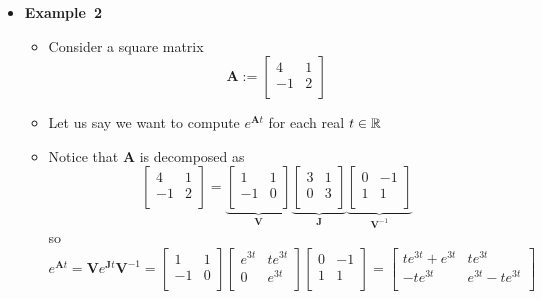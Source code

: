 \documentclass[12pt,a4paper]{article}
\begin{document}
\begin{itemize}
\item \textbf{Example~2}
  \begin{itemize}
  \item Consider a square matrix
    \begin{equation}\nonumber%
      \bm{A} :=
      \begin{bmatrix}
        4 & 1 \\
        -1 & 2 \\
      \end{bmatrix}
    \end{equation}
  \item Let us say we want to compute $e^{\bm{A}t}$ for each real $t\in \mathbb{R}$
  \item Notice that $\bm{A}$ is decomposed as
    \begin{equation}\nonumber%
      \begin{bmatrix}
        4 & 1 \\
        -1 & 2 \\
      \end{bmatrix}
      =
      \underbrace{
      \begin{bmatrix}
        1 & 1 \\
        -1 & 0 \\
      \end{bmatrix}}_{\bm{V}}
    \underbrace{
      \begin{bmatrix}
        3 & 1 \\
        0 & 3 \\
      \end{bmatrix}}_{\bm{J}}
    \underbrace{
      \begin{bmatrix}
        0 & -1 \\
        1 & 1 \\
      \end{bmatrix}}_{\bm{V}^{-1}}
    \end{equation}
    so
    \begin{equation}
      e^{\bm{A}t}
         = \bm{V}e^{\bm{J}t}\bm{V}^{-1}
         =
      \begin{bmatrix}
        1 & 1 \\
        -1 & 0 \\
      \end{bmatrix}
      \begin{bmatrix}
        e^{3t} & te^{3t} \\
        0 & e^{3t} \\
      \end{bmatrix}
      \begin{bmatrix}
        0 & -1 \\
        1 & 1 \\
      \end{bmatrix}
      =
      \begin{bmatrix}
        te^{3t} + e^{3t} & te^{3t} \\
        -te^{3t} & e^{3t} -te^{3t} \\
      \end{bmatrix}
    \nonumber%
  \end{equation}

  \end{itemize}
\end{itemize}
\end{document}
